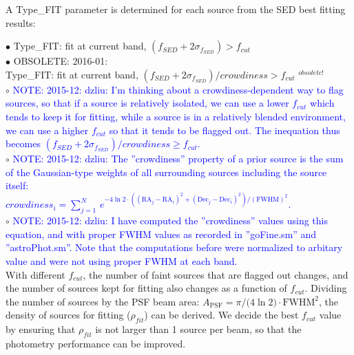 \documentclass[11pt,a4paper]{article}
\begin{document}
A Type\_FIT parameter is determined for each source from the SED best fitting results:

\indent\hspace{15pt}$\bullet$ 
Type\_FIT: fit at current band, $(f_{SED}+2\sigma_{f_{SED}}) > f_{cut}$
\\
\textcolor{black!30!white}{
\indent\hspace{15pt}$\bullet$ 
OBSOLETE: 2016-01: \\
\indent\hspace{20pt}
Type\_FIT: fit at current band, $(f_{SED}+2\sigma_{f_{SED}})/crowdiness > f_{cut}$
$^{obsolete!}$
}
\\
\indent\hspace{15pt}$\circ$ 
\textcolor{blue}{NOTE: 2015-12: dzliu: I'm thinking about a crowdiness-dependent way to flag sources, so that if a source is relatively isolated, we can use a lower $f_{cut}$ which tends to keep it for fitting, while a source is in a relatively blended environment, we can use a higher $f_{cut}$ so that it tends to be flagged out. The inequation thus becomes $(f_{SED}+2\sigma_{f_{SED}})/crowdiness \ge f_{cut}$.}
\\
\indent\hspace{15pt}$\circ$ 
\textcolor{blue}{NOTE: 2015-12: dzliu: The ''crowdiness'' property of a prior source is the sum of the Gaussian-type weights of all surrounding sources including the source itself: 
\\
$crowdiness_{i} = \sum_{j=1}^{N} \, e^{-4\ln{2}\cdot\left((\mathrm{RA}_{j}-\mathrm{RA}_{i})^2+(\mathrm{Dec}_{j}-\mathrm{Dec}_{i})^2\right)/\left(\mathrm{FWHM}\right)^2}$. }
\\
\indent\hspace{15pt}$\circ$ 
\textcolor{blue}{NOTE: 2015-12: dzliu: I have computed the ''crowdiness'' values using this equation, and with proper FWHM values as recorded in ''goFine.sm'' and ''astroPhot.sm''. Note that the computations before were normalized to arbitary value and were not using proper FWHM at each band. }
\\

With different $f_{cut}$, the number of faint sources that are flagged out changes, and the number of sources kept for fitting also changes as a function of $f_{cut}$. Dividing the number of sources by the PSF beam area: $A_\mathrm{PSF}={\pi}/({4\ln{2})}\cdot\mathrm{FWHM}^2$, the density of sources for fitting ($\rho_{fit}$) can be derived. We decide the best $f_{cut}$ value by ensuring that  $\rho_{fit}$ is not larger than 1 source per beam, so that the photometry performance can be improved. 
\end{document}
